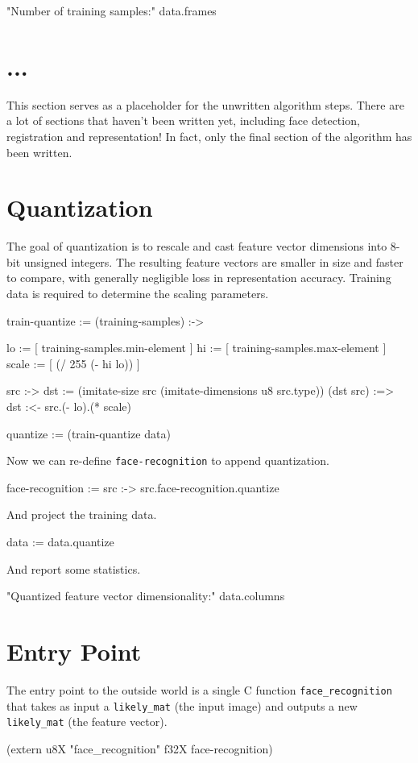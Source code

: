 \documentclass{article}
\begin{document}
\begin{likely}
"Number of training samples:"
data.frames
\end{likely}

\section{...}
This section serves as a placeholder for the unwritten algorithm steps.
There are a lot of sections that haven't been written yet, including face detection, registration and representation!
In fact, only the final section of the algorithm has been written.

\section{Quantization}
The goal of quantization is to rescale and cast feature vector dimensions into 8-bit unsigned integers.
The resulting feature vectors are smaller in size and faster to compare, with generally negligible loss in representation accuracy.
Training data is required to determine the scaling parameters.

\begin{likely}
train-quantize :=
  (training-samples) :->
  {
    lo    := [ training-samples.min-element  ]
    hi    := [ training-samples.max-element  ]
    scale := [ (/ 255 (- hi lo)) ]

    src :->
    {
      dst := (imitate-size src (imitate-dimensions u8 src.type))
      (dst src) :=>
        dst :<- src.(- lo).(* scale)
    }
  }

quantize := (train-quantize data)
\end{likely}

Now we can re-define \texttt{face-recognition} to append quantization.

\begin{likely}
face-recognition :=
  src :->
    src.face-recognition.quantize
\end{likely}

And project the training data.

\begin{likely}
data := data.quantize
\end{likely}

And report some statistics.

\begin{likely}
"Quantized feature vector dimensionality:"
data.columns
\end{likely}

\section{Entry Point}
The entry point to the outside world is a single C function \texttt{face\_recognition} that takes as input a \texttt{likely\_mat} (the input image) and outputs a new \texttt{likely\_mat} (the feature vector).

\begin{likely}
(extern u8X "face_recognition" f32X face-recognition)
\end{likely}
\end{document}
